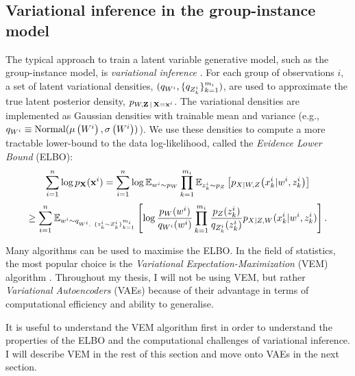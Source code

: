 \documentclass[../thesis.tex]{subfiles}
\begin{document}
\subsection{Variational inference in the group-instance model}

The typical approach to train a latent variable generative model, such as the group-instance model, is \textit{variational inference} \citep{bleiVariationalInferenceReview2017}. For each group of observations $i$, a set of latent variational densities, $(\myfunc{q}_{\myrv{w}^i}, \{\myfunc{q}_{\myrv{z}^i_k}\}_{k=1}^{\mycnt{m}_i})$, are used to approximate the true latent posterior density, $\myfunc{p}_{\myrv{w}, \mygroup{\myrv{z}} \,|\, \mygroup{\myrv{x}} = \mygroup{\myvect{x}}^i}$. The variational densities are implemented as Gaussian densities with trainable mean and variance (e.g., $\myfunc{q}_{\myrv{w}^i} \equiv \mathrm{Normal}(\myvect{\mu} \left( {\myrv{w}}^i \right), \myvect{\sigma} \left( {\myrv{w}}^i \right))$). We use these densities to compute a more tractable lower-bound to the data log-likelihood, called the \textit{Evidence Lower Bound} (ELBO):
\[
    \sum_{i=1}^\mycnt{n} \log \myfunc{p}_{\mygroup{\myrv{x}}} (\mygroup{\myvect{x}}^i) = \sum_{i=1}^\mycnt{n} \log \myexp{p}{\myvect{w}^i}{\myrv{w}} \prod_{k=1}^{\mycnt{m}_i} \myexp{p}{\myvect{z}^i_k}{\myrv{z}} \left[ \myfunc{p}_{\myrv{x} | \myrv{w}, \myrv{z}} \bigl(\myvect{x}^i_k | \myvect{w}^i, \myvect{z}^i_k \bigr) \right]
\]
\[
    \geq \sum_{i=1}^\mycnt{n} \myexp{q}{\myvect{w}^i}{\myrv{w}^i, ~ \{\myvect{z}^i_k \sim \myrv{z}^i_k\}_{k=1}^{\mycnt{m}_i}} \left[ \log \frac{\myfunc{p}_{\myrv{w}} (\myvect{w}^i)}{\myfunc{q}_{\myrv{w}^i} (\myvect{w}^i)} \prod_{k=1}^{\mycnt{m}_i} \frac{\myfunc{p}_{\myrv{z}} (\myvect{z}^i_k)}{\myfunc{q}_{\myrv{z}^i_k} (\myvect{z}^i_k)} \myfunc{p}_{\myrv{x} | \myrv{z}, \myrv{w}} (\myvect{x}^i_k | \myvect{w}^i, \myvect{z}^i_k) \right].
\]

Many algorithms can be used to maximise the ELBO. In the field of statistics, the most popular choice is the \textit{Variational Expectation-Maximization} (VEM) algorithm \citep{dempsterMaximumLikelihoodIncomplete1977,bealVariationalAlgorithmsApproximate2003}. Throughout my thesis, I will not be using VEM, but rather \textit{Variational Autoencoders} (VAEs) because of their advantage in terms of computational efficiency and ability to generalise. 

It is useful to understand the VEM algorithm first in order to understand the properties of the ELBO and the computational challenges of variational inference. I will describe VEM in the rest of this section and move onto VAEs in the next section.
\end{document}
